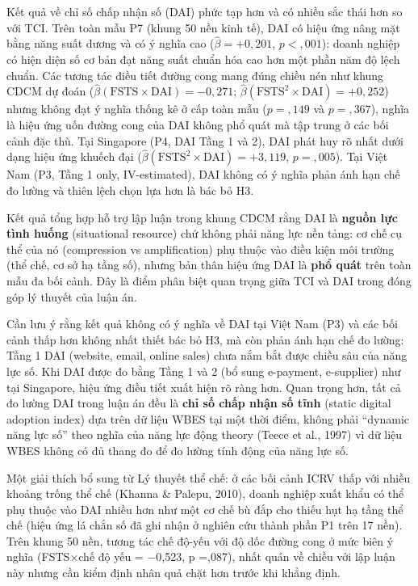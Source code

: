 \documentclass[
  a4paper,
  13pt]{extreport}
\begin{document}
Kết quả về chỉ số chấp nhận số (DAI) phức tạp hơn và có nhiều sắc thái
hơn so với TCI. Trên toàn mẫu P7 (khung 50 nền kinh tế), DAI có hiệu ứng
nâng mặt bằng năng suất dương và có ý nghĩa cao
(\(\hat{\beta} = +0{,}201\), \(p < {,}001\)): doanh nghiệp có hiện diện
số cơ bản đạt năng suất chuẩn hóa cao hơn một phần năm độ lệch chuẩn.
Các tương tác điều tiết đường cong mang đúng chiều nén như khung CDCM dự
đoán (\(\hat{\beta}(\text{FSTS} \times \text{DAI}) = -0{,}271\);
\(\hat{\beta}(\text{FSTS}^2 \times \text{DAI}) = +0{,}252\)) nhưng không
đạt ý nghĩa thống kê ở cấp toàn mẫu (\(p = {,}149\) và \(p = {,}367\)),
nghĩa là hiệu ứng uốn đường cong của DAI không phổ quát mà tập trung ở
các bối cảnh đặc thù. Tại Singapore (P4, DAI Tầng 1 và 2), DAI phát huy
rõ nhất dưới dạng hiệu ứng khuếch đại
(\(\hat{\beta}(\text{FSTS}^2 \times \text{DAI}) = +3{,}119\),
\(p = {,}005\)). Tại Việt Nam (P3, Tầng 1 only, IV-estimated), DAI không
có ý nghĩa phản ánh hạn chế đo lường và thiên lệch chọn lựa hơn là bác
bỏ H3.

Kết quả tổng hợp hỗ trợ lập luận trong khung CDCM rằng DAI là
\textbf{nguồn lực tình huống} (situational resource) chứ không phải năng
lực nền tảng: cơ chế cụ thể của nó (compression vs amplification) phụ
thuộc vào điều kiện môi trường (thể chế, cơ sở hạ tầng số), nhưng bản
thân hiệu ứng DAI là \textbf{phổ quát} trên toàn mẫu đa bối cảnh. Đây là
điểm phân biệt quan trọng giữa TCI và DAI trong đóng góp lý thuyết của
luận án.

Cần lưu ý rằng kết quả không có ý nghĩa về DAI tại Việt Nam (P3) và các
bối cảnh thấp hơn không nhất thiết bác bỏ H3, mà còn phản ánh hạn chế đo
lường: Tầng 1 DAI (website, email, online sales) chưa nắm bắt được chiều
sâu của năng lực số. Khi DAI được đo bằng Tầng 1 và 2 (bổ sung
e-payment, e-supplier) như tại Singapore, hiệu ứng điều tiết xuất hiện
rõ ràng hơn. Quan trọng hơn, tất cả đo lường DAI trong luận án đều là
\textbf{chỉ số chấp nhận số tĩnh} (static digital adoption index) dựa
trên dữ liệu WBES tại một thời điểm, không phải ``dynamic năng lực số''
theo nghĩa của năng lực động theory (Teece et al., 1997) vì dữ liệu WBES
không có đủ thang đo để đo lường tính động của năng lực số.

Một giải thích bổ sung từ Lý thuyết thể chế: ở các bối cảnh ICRV thấp
với nhiều khoảng trống thể chế (Khanna \& Palepu, 2010), doanh nghiệp
xuất khẩu có thể phụ thuộc vào DAI nhiều hơn như một cơ chế bù đắp cho
thiếu hụt hạ tầng thể chế (hiệu ứng lá chắn số đã ghi nhận ở nghiên cứu
thành phần P1 trên 17 nền). Trên khung 50 nền, tương tác chế độ-yếu với
độ dốc đường cong ở mức biên ý nghĩa (FSTS×chế độ yếu = −0,523, p
=,087), nhất quán về chiều với lập luận này nhưng cần kiểm định nhân quả
chặt hơn trước khi khẳng định.
\end{document}
